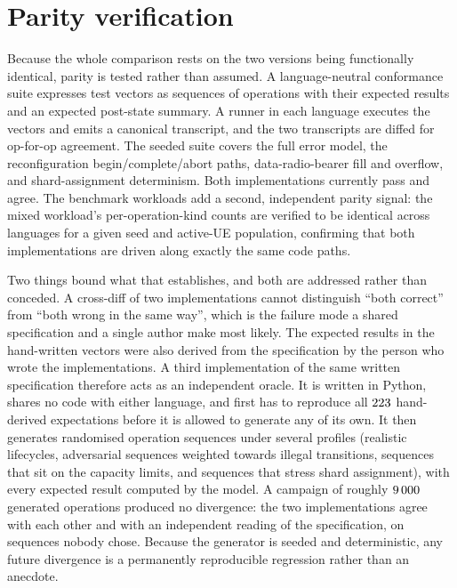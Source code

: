 \documentclass[english,twoside,openright,a4paper,censored,csm,software-track-2020]{HYthesisML}
\begin{document}
\section{Parity verification}
\label{sec:parity}
Because the whole comparison rests on the two versions being functionally identical, parity
is tested rather than assumed. A language-neutral conformance suite expresses test vectors as
sequences of operations with their expected results and an expected post-state summary. A
runner in each language executes the vectors and emits a canonical transcript, and the two
transcripts are diffed for op-for-op agreement. The seeded suite covers the full error model,
the reconfiguration begin/complete/abort paths, data-radio-bearer fill and overflow, and
shard-assignment determinism. Both implementations currently pass and agree. The benchmark
workloads add a second, independent parity signal: the mixed workload's per-operation-kind
counts are verified to be identical across languages for a given seed and active-UE
population, confirming that both implementations are driven along exactly the same code paths.

Two things bound what that establishes, and both are addressed rather than conceded. A
cross-diff of two implementations cannot distinguish ``both correct'' from ``both wrong in the
same way'', which is the failure mode a shared specification and a single author make most
likely. The expected results in the hand-written vectors were also derived from the
specification by the person who wrote the implementations. A third implementation of the
same written specification therefore acts as an independent oracle. It is written in Python,
shares no code with either language, and first has to reproduce all $223$ hand-derived
expectations before it is allowed to generate any of its own. It then generates randomised
operation sequences under several profiles (realistic lifecycles, adversarial sequences
weighted towards illegal transitions, sequences that sit on the capacity limits, and sequences
that stress shard assignment), with every expected result computed by the model. A campaign
of roughly $9\,000$ generated operations produced no divergence: the two implementations
agree with each other and with an independent reading of the specification, on sequences nobody
chose. Because the generator is seeded and deterministic, any future divergence is a
permanently reproducible regression rather than an anecdote.
\end{document}
